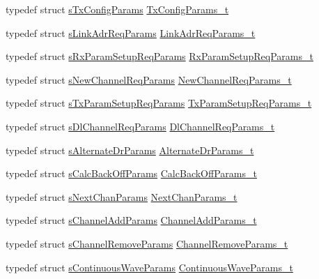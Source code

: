 \begin{DoxyCompactItemize}
typedef struct \hyperlink{structsTxConfigParams}{s\+Tx\+Config\+Params} \hyperlink{group__REGION_gabed730d4d04b0b60d4b6d1966d3f21d3}{Tx\+Config\+Params\+\_\+t}
\item 
typedef struct \hyperlink{structsLinkAdrReqParams}{s\+Link\+Adr\+Req\+Params} \hyperlink{group__REGION_gad4af503e8d4de1846129e26a799a1e8e}{Link\+Adr\+Req\+Params\+\_\+t}
\item 
typedef struct \hyperlink{structsRxParamSetupReqParams}{s\+Rx\+Param\+Setup\+Req\+Params} \hyperlink{group__REGION_ga7165f282c670c728c36d534df2285157}{Rx\+Param\+Setup\+Req\+Params\+\_\+t}
\item 
typedef struct \hyperlink{structsNewChannelReqParams}{s\+New\+Channel\+Req\+Params} \hyperlink{group__REGION_gae2abcdb6dbb843c9faf5fd3009eca9d6}{New\+Channel\+Req\+Params\+\_\+t}
\item 
typedef struct \hyperlink{structsTxParamSetupReqParams}{s\+Tx\+Param\+Setup\+Req\+Params} \hyperlink{group__REGION_ga26836ef2996e70410e42ef471073f855}{Tx\+Param\+Setup\+Req\+Params\+\_\+t}
\item 
typedef struct \hyperlink{structsDlChannelReqParams}{s\+Dl\+Channel\+Req\+Params} \hyperlink{group__REGION_gae0d608ff1f8ea0a430e4f9a4c38ec7f3}{Dl\+Channel\+Req\+Params\+\_\+t}
\item 
typedef struct \hyperlink{structsAlternateDrParams}{s\+Alternate\+Dr\+Params} \hyperlink{group__REGION_ga001ea4338d1c83f4c785b49d7ad2d696}{Alternate\+Dr\+Params\+\_\+t}
\item 
typedef struct \hyperlink{structsCalcBackOffParams}{s\+Calc\+Back\+Off\+Params} \hyperlink{group__REGION_ga7c5c9a8da174e6679eded8257dc92fd9}{Calc\+Back\+Off\+Params\+\_\+t}
\item 
typedef struct \hyperlink{structsNextChanParams}{s\+Next\+Chan\+Params} \hyperlink{group__REGION_ga115f5e83afae352c0a3dcdc193374040}{Next\+Chan\+Params\+\_\+t}
\item 
typedef struct \hyperlink{structsChannelAddParams}{s\+Channel\+Add\+Params} \hyperlink{group__REGION_gab1c5f3aa06614283202906cef4417860}{Channel\+Add\+Params\+\_\+t}
\item 
typedef struct \hyperlink{structsChannelRemoveParams}{s\+Channel\+Remove\+Params} \hyperlink{group__REGION_gaa37468560d2fc81a977b57a48e5d72c0}{Channel\+Remove\+Params\+\_\+t}
\item 
typedef struct \hyperlink{structsContinuousWaveParams}{s\+Continuous\+Wave\+Params} \hyperlink{group__REGION_gaf39bb5ba06921139c6d17f88a8d518cd}{Continuous\+Wave\+Params\+\_\+t}
\end{DoxyCompactItemize}
